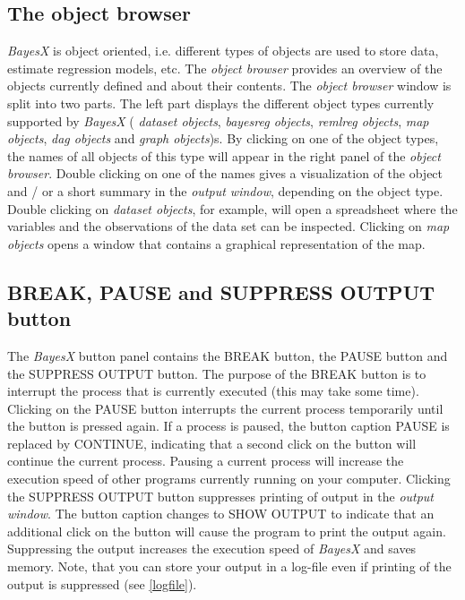 \subsection{The object browser}

{\em BayesX} is object oriented, i.e. different types of objects are used to store data, estimate regression models, etc. The
{\em object browser} provides an overview of the objects currently defined and about their contents. The {\em object browser}
window is split into two parts. The left part displays the different object types currently supported by {\em BayesX} ({\em
dataset objects}, {\em bayesreg objects}, {\em remlreg objects}, {\em map objects}, {\em dag objects} and {\em graph
objects})s. By clicking on one of the object types, the names of all objects of this type will appear in the right panel of the
{\em object browser}. Double clicking on one of the names gives a visualization of the object and / or a short summary in the
{\em output window}, depending on the object type. Double clicking on {\em dataset objects}, for example, will open a
spreadsheet where the variables and the observations of the data set can be inspected. Clicking on {\em map objects} opens a
window that contains a graphical representation of the map.

\subsection{BREAK, PAUSE and SUPPRESS OUTPUT button}
\label{buttons}  
  
 

The {\em BayesX} button panel contains the BREAK button, the PAUSE button and the SUPPRESS OUTPUT button. The purpose of the
BREAK button is to interrupt the process that is currently executed (this may take some time). Clicking on the PAUSE button
interrupts the current process temporarily until the button is pressed again. If a process is paused, the button caption PAUSE
is replaced by CONTINUE, indicating that a second click on the button will continue the current process. Pausing a current
process will increase the execution speed of other programs currently running on your computer. Clicking the SUPPRESS OUTPUT
button suppresses printing of output in the {\em output window}. The button caption changes to SHOW OUTPUT to indicate that an
additional click on the button will cause the program to print the output again. Suppressing the output increases the execution
speed of {\em BayesX} and saves memory. Note, that you can store your output in a log-file even if printing of the output is
suppressed (see \autoref{logfile}).

